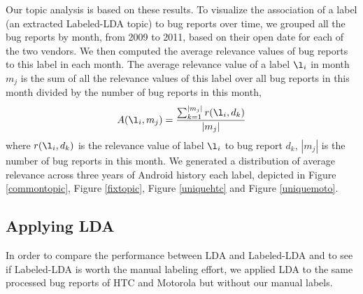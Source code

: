 \documentclass[10pt, conference, compsocconf]{IEEEtran}
\begin{document}
Our topic analysis is based on these results. 
To visualize the association of a label (an extracted
Labeled-LDA topic) to bug reports over time,
we grouped
all the bug reports by month, from 2009 to 2011, based on their open
date for each of the two vendors. 
We then computed the average relevance values of bug
reports to this label in each month. 
The average relevance value of a label \begin{math} \l_i \end{math} in
month \begin{math} m_j \end{math} is the sum of all the relevance
values of this label over all bug reports in this month divided by the
number of bug reports in this month,
\begin{equation}
A(\l_i,m_j) = \frac{\sum_{\substack{k=1}}^{|m_j|}r(\l_i,d_k)}{|m_j|}
\label{equation1}
\end{equation}
where $r(\l_i,d_k)$ is the relevance value of label $\l_i$ to bug
report $d_k$, $|m_j|$ is the number of bug reports in this month. 
We generated a distribution of average relevance across three years of
Android history
each label, depicted in Figure \ref{commontopic}, Figure \ref{fixtopic},
Figure \ref{uniquehtc} and Figure \ref{uniquemoto}.


\subsection{Applying LDA}




In order to compare the performance between LDA and Labeled-LDA and
 to see if Labeled-LDA is worth the manual labeling effort, 
we applied LDA to the same processed bug reports of HTC and Motorola
but without our manual labels. 
\end{document}
